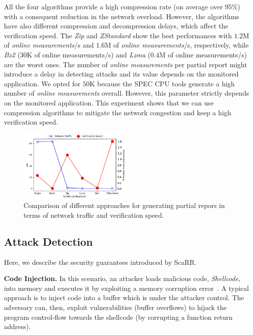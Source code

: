 All the four algorithms provide a high compression rate (on average over 
$95$\%) with a consequent reduction in the network overload.
However, the algorithms have also different compression and decompression 
delays, which affect the verification speed.
The \emph{Zip} and \emph{ZStandard} show the best performances with $1.2$M of 
\emph{online measurements}/s and $1.6$M of \emph{online measurements}/s, 
respectively, while \emph{Bz2} ($30$K of online measurements/s) and \emph{Lzma} 
($0.4$M of online measurements/s) are the worst ones. 
The number of \emph{online measurements} per partial report might introduce a 
delay in
detecting attacks and its value depends on the monitored application.
We opted for $50$K because the SPEC CPU tools generate a high number of 
\emph{online measurements} overall.
However, this parameter strictly depends on the monitored application.
This experiment shows that we can use compression algorithms to mitigate the 
network congestion and keep a high verification speed.

\begin{figure}[t]
	\centering
	\includegraphics[width=0.5\textwidth]{fig_c4/network_performance.png}
	\caption[ScaRR network traffic evaluation.]{Comparison of different 
	approaches for generating partial repors in terms of network traffic and 
	verification speed.}
	\label{fig:network_performance}
\end{figure} 

\subsection{Attack Detection}
\label{ssec:security+privacy+consideration}
Here, we describe the security guarantees introduced by ScaRR. 

\textbf{Code Injection.}
In this scenario, an attacker loads malicious code, \eg \emph{Shellcode}, into 
memory and executes it by exploiting a memory corruption 
error~\cite{smith1997stack}.
A typical approach is to inject code into a buffer which is under the attacker 
control.
The adversary can, then, exploit vulnerabilities (\eg buffer overflows) to 
hijack the program control-flow towards the shellcode (\eg by corrupting a 
function return address).

